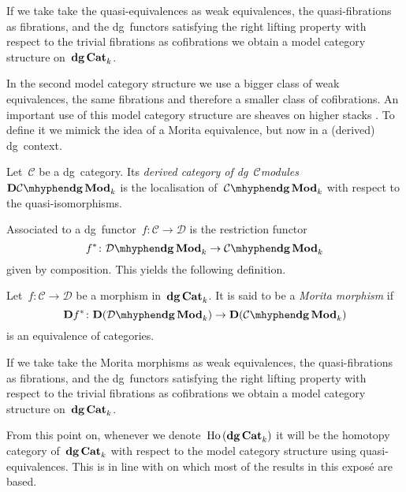 \begin{theorem}
  \label{theorem:quasi-equivalences-model-category-structure}
  If we take take the quasi-equivalences as weak equivalences, the quasi-fibrations as fibrations, and the dg~functors satisfying the right lifting property with respect to the trivial fibrations as cofibrations we obtain a model category structure on~$\mathbf{dg\,Cat}_k$.
\end{theorem}

In the second model category structure we use a bigger class of weak equivalences, the same fibrations and therefore a smaller class of cofibrations. An important use of this model category structure are sheaves on higher stacks \cite{chern}. To define it we mimick the idea of a Morita equivalence, but now in a (derived) dg~context.
\begin{definition}
  Let~$\mathcal{C}$ be a dg~category. Its \emph{derived category of dg~$\mathcal{C}$\dash modules}~$\mathbf{D}\dgMod{\mathcal{C}}_k$ is the localisation of~$\dgMod{\mathcal{C}}_k$ with respect to the quasi-isomorphisms.
\end{definition}
Associated to a dg~functor~$f\colon\mathcal{C}\to\mathcal{D}$ is the restriction functor
\begin{equation}
  f^*\colon\dgMod{\mathcal{D}}_k\to\dgMod{\mathcal{C}}_k
\end{equation}
given by composition. This yields the following definition.
\begin{definition}
  Let~$f\colon\mathcal{C}\to\mathcal{D}$ be a morphism in~$\mathbf{dg\,Cat}_k$. It is said to be a \emph{Morita morphism} if
  \begin{equation}
    \mathbf{D}f^*\colon\mathbf{D}(\dgMod{\mathcal{D}}_k)\to\mathbf{D}(\dgMod{\mathcal{C}}_k)
  \end{equation}
  is an equivalence of categories.
\end{definition}

\begin{theorem}
  \label{theorem:morita-morphisms-model-category-structure}
  If we take take the Morita morphisms as weak equivalences, the quasi-fibrations as fibrations, and the dg~functors satisfying the right lifting property with respect to the trivial fibrations as cofibrations we obtain a model category structure on~$\mathbf{dg\,Cat}_k$.
\end{theorem}

\begin{remark}
  From this point on, whenever we denote~$\mathrm{Ho} \,(\mathbf{dg\,Cat}_k)$ it will be the homotopy category of~$\mathbf{dg\,Cat}_k$ with respect to the model category structure using quasi-equivalences. This is in line with \cite{toen} on which most of the results in this expos\'e are based.
\end{remark}


